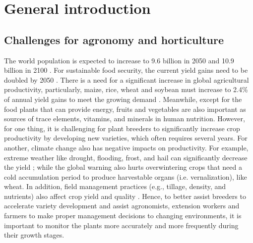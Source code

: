 \chapter{General introduction}

\section{Challenges for agronomy and horticulture}


The world population is expected to increase to 9.6 billion in 2050 and 10.9 billion in 2100 \citep{gerland_world_2014}. For sustainable food security, the current yield gains need to be doubled by 2050 \citep{tilman_global_2011, ray_yield_2013}. There is a need for a significant increase in global agricultural productivity, particularly, maize, rice, wheat and soybean must increase to 2.4\% of annual yield gains to meet the growing demand \citep{ray_yield_2013}. Meanwhile, except for the food plants that can provide energy, fruits and vegetables are also important as sources of trace elements, vitamins, and minerals in human nutrition. However, for one thing, it is challenging for plant breeders to significantly increase crop productivity by developing new varieties, which often requires several years. For another, climate change also has negative impacts on productivity. For example, extreme weather like drought, flooding, frost, and hail can significantly decrease the yield \citep{lobell_influence_2012}; while the global warning also hurts overwintering crops that need a cold accumulation period to produce harvestable organs (i.e. vernalization), like wheat. In addition, field management practices (e.g., tillage, density, and nutrients) also affect crop yield and quality \citep{jackson_onfarm_2004, satodiya_effect_2015}. Hence, to better assist breeders to accelerate variety development and assist agronomists, extension workers and farmers to make proper management decisions to changing environments, it is important to monitor the plants more accurately and more frequently during their growth stages.

